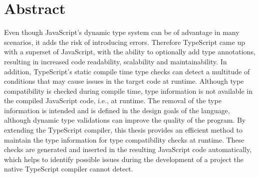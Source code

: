 \chapter{Abstract}


Even though JavaScript's dynamic type system can be of advantage in many scenarios, it adds the risk of introducing errors. Therefore TypeScript came up with a superset of JavaScript, with the ability to optionally add type annotations, resulting in increased code readability, scalability and maintainability. In addition, TypeScript's static compile time type checks can detect a multitude of conditions that may cause issues in the target code at runtime. Although type compatibility is checked during compile time, type information is not available in the compiled JavaScript code, i.e., at runtime. The removal of the type information is intended and is defined in the design goals of the language, although dynamic type validations can improve the quality of the program. By extending the TypeScript compiler, this thesis provides an efficient method to maintain the type information for type compatibility checks at runtime. These checks are generated and inserted in the resulting JavaScript code automatically, which helps to identify possible issues during the development of a project the native TypeScript compiler cannot detect.
